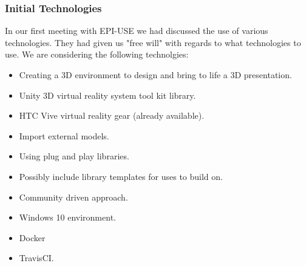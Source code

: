 	\subsubsection{Initial Technologies}
		In our first meeting with EPI-USE we had discussed the use of various technologies. They had given us "free will" with regards to what technologies to use. We are considering the following technolgies:
		\begin{itemize}
			\item Creating a 3D environment to design and bring to life a 3D presentation.
			\item Unity 3D virtual reality system tool kit library.
			\item HTC Vive virtual reality gear (already available).
			\item Import external models.
			\item Using plug and play libraries.
			\item Possibly include library templates for uses to build on.
			\item Community driven approach.
			\item Windows 10 environment.
			\item Docker
			\item TravisCI.
		\end{itemize}

